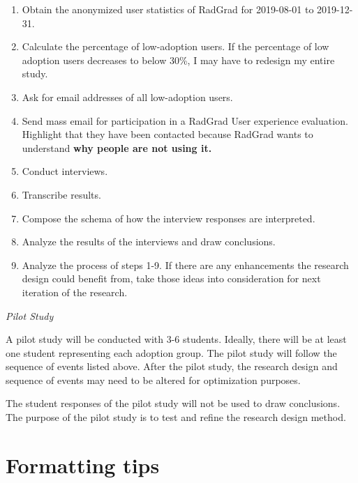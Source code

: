 \documentclass[english]{proposalnsf}
\begin{document}
\begin{enumerate}
	\item Obtain the anonymized user statistics of RadGrad for 2019-08-01 to 2019-12-31.
	\item Calculate the percentage of low-adoption users. If the percentage of low adoption users decreases to below 30{\%}, I may have to redesign my entire study. 
	\item Ask for email addresses of all low-adoption users.
	\item Send mass email for participation in a RadGrad User experience evaluation. Highlight that they have been contacted because RadGrad wants to understand \textbf{why people are not using it.}
	\item Conduct interviews.
	\item Transcribe results.
	\item Compose the schema of how the interview responses are interpreted.
	\item Analyze the results of the interviews and draw conclusions.
	\item Analyze the process of steps 1-9. If there are any enhancements the research design could benefit from, take those ideas into consideration for next iteration of the research.
\end{enumerate}

{\em Pilot Study}

A pilot study will be conducted with 3-6 students. Ideally, there will be at least one student representing each adoption group. The pilot study will follow the sequence of events listed above. After the pilot study, the research design and sequence of events may need to be altered for optimization purposes.  

The student responses of the pilot study will not be used to draw conclusions. The purpose of the pilot study is to test and refine the research design method.  




\appendix
\section{Formatting tips}
\end{document}
